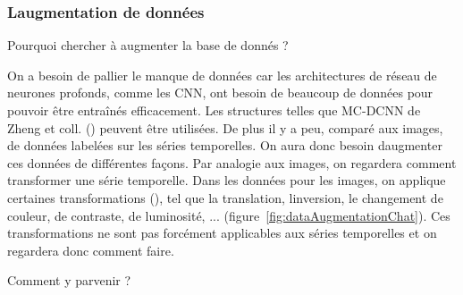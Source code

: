 \documentclass[11pt,final,ENIB]{sdm}
\begin{document}
{		\subsubsection{L\textquotesingle augmentation de donn\'ees}
		\label{seq:dataAugmentation}
			\medbreak

			\begin{itshape}{Pourquoi chercher \`a augmenter la base de donn\'es ?}\end{itshape}

			On a besoin de pallier le manque de donn\'ees car les architectures de r\'eseau de neurones profonds, comme les CNN, ont besoin de beaucoup de donn\'ees pour pouvoir \^etre entra\^in\'es efficacement. Les structures telles que MC-DCNN de Zheng et coll. (\cite{zheng2014time}) peuvent \^etre utilis\'ees.
			De plus il y a peu, compar\'e aux images, de donn\'ees label\'ees sur les s\'eries temporelles. On aura donc besoin d\textquotesingle augmenter ces donn\'ees de diff\'erentes fa\c cons.
			Par analogie aux images, on regardera comment transformer une s\'erie temporelle. Dans les donn\'ees pour les images, on applique certaines transformations (\cite{krizhevsky2012imagenet}\cite{howard2013some}), tel que la translation, l\textquotesingle inversion, le changement de couleur, de contraste, de luminosit\'e, ... (figure~\ref{fig:dataAugmentationChat}). Ces transformations ne sont pas forc\'ement applicables aux s\'eries temporelles et on regardera donc comment faire.

			\medbreak

			\begin{itshape}{Comment y parvenir ?}\end{itshape}
			
}
\end{document}
